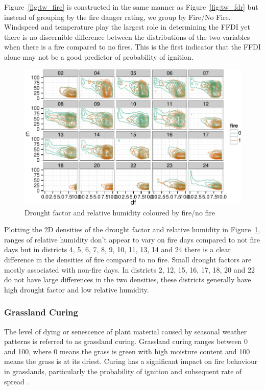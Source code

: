 \documentclass[11pt,a4paper]{article}
\begin{document}
Figure~\ref{fig:tw_fire} is constructed in the same manner as Figure~\ref{fig:tw_fdr} but instead of grouping by the fire danger rating, we group by Fire/No Fire. Windspeed and temperature play the largest role in determining the FFDI yet there is no discernible difference between the distributions of the two variables when there is a fire compared to no fires. This is the first indicator that the FFDI alone may not be a good predictor of probability of ignition.

\begin{figure}
  \centering
  \includegraphics[width=\textwidth]{figures/dh_fire.pdf}
  \caption{Drought factor and relative humidity coloured by fire/no fire}
  \label{fig:dh_fire}
\end{figure}

Plotting the 2D densities of the drought factor and relative humidity in Figure~\ref{fig:dh_fire}, ranges of relative humidity don't appear to vary on fire days compared to not fire days but in districts 4, 5, 6, 7, 8, 9, 10, 11, 13, 14 and 24 there is a clear difference in the densities of fire compared to no fire. Small drought factors are mostly associated with non-fire days. In districts 2, 12, 15, 16, 17, 18, 20 and 22 do not have large differences in the two densities, these districts generally have high drought factor and low relative humidity.


\subsubsection{Grassland Curing}

The level of dying or senescence of plant material caused by seasonal weather patterns is referred to as grassland curing. Grassland curing ranges between 0 and 100, where 0 means the grass is green with high moisture content and 100 means the grass is at its driest. Curing has a significant impact on fire behaviour in grasslands, particularly the probability of ignition and subsequent rate of spread \citep{cheney08}.
\end{document}
